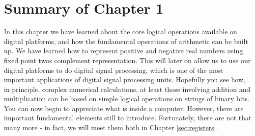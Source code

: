\documentclass[../physical_computing.tex]{subfiles}
\begin{document}
\section{Summary of Chapter 1}
\label{sec:ch1summary}

In this chapter we have learned about the core logical operations
available on digital platforms, and how the fundamental operations
of arithmetic can be built up. We have learned how to represent
positive and negative real numbers using fixed point twos
complement representation. This will later on allow us to use
our digital platforms to do digital signal processing, which is 
one of the most important applications of digital signal processing
units. Hopefully you see how, in principle, complex numerical
calculations, at least those involving addition and multiplication
can be based on simple logical operations on strings of binary 
bits. You can now begin to appreciate what is inside a computer.
However, there are important fundamental elements still to introduce.
Fortunately, there are not that many more - in fact, we will meet
them both in Chapter \ref{sec:registers}.
\end{document}
